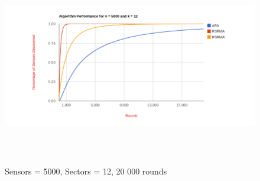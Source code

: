 \begin{figure}[ht]
\caption{Sensors = 5000, Sectors = 12, 20 000 rounds}
\includegraphics[height = 8cm]{pics/graph5000k12b.png}\\[0.5cm] 
\label{fig:n5000k12b}   
\end{figure}